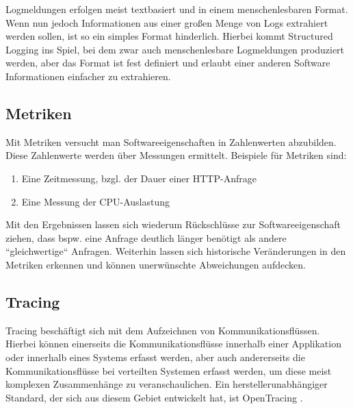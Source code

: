 %

Logmeldungen erfolgen meist textbasiert und in einem menschenlesbaren Format. Wenn nun jedoch Informationen aus einer großen Menge von Logs extrahiert werden sollen, ist so ein simples Format hinderlich. Hierbei kommt Structured Logging ins Spiel, bei dem zwar auch menschenlesbare Logmeldungen produziert werden, aber das Format ist fest definiert und erlaubt einer anderen Software Informationen einfacher zu extrahieren.

\subsection{Metriken}

Mit Metriken versucht man Softwareeigenschaften in Zahlenwerten abzubilden. Diese Zahlenwerte werden über Messungen ermittelt. Beispiele für Metriken sind:

\begin{enumerate}
	\item Eine Zeitmessung, bzgl. der Dauer einer HTTP-Anfrage
	\item Eine Messung der CPU-Auslastung
\end{enumerate}

Mit den Ergebnissen lassen sich wiederum Rückschlüsse zur Softwareeigenschaft ziehen, dass bspw. eine Anfrage deutlich länger benötigt als andere ``gleichwertige`` Anfragen. Weiterhin lassen sich historische Veränderungen in den Metriken erkennen und können unerwünschte Abweichungen aufdecken.

\subsection{Tracing}
\label{sec:tracing}

Tracing beschäftigt sich mit dem Aufzeichnen von Kommunikationsflüssen. Hierbei können einerseits die Kommunikationsflüsse innerhalb einer Applikation oder innerhalb eines Systems erfasst werden, aber auch andererseits die Kommunikationsflüsse bei verteilten Systemen erfasst werden, um diese meist komplexen Zusammenhänge zu veranschaulichen. Ein herstellerunabhängiger Standard, der sich aus diesem Gebiet entwickelt hat, ist OpenTracing \cite{OpenTracing}.

